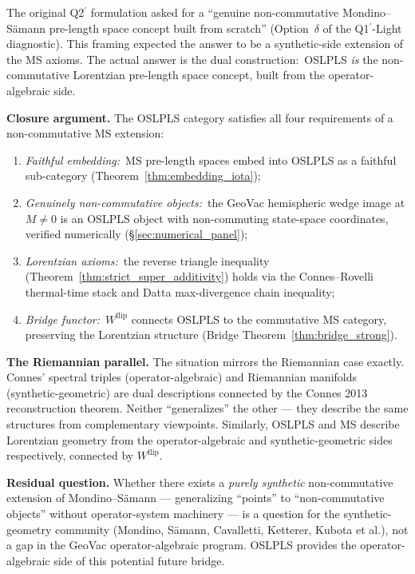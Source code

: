 \documentclass[11pt,a4paper]{article}
\theoremstyle{plain}
\theoremstyle{definition}
\newcommand{\Wflip}{W^{\mathrm{flip}}}
\begin{document}
The original Q2$^{\prime}$ formulation asked for a ``genuine
non-commutative Mondino--S\"amann pre-length space concept built
from scratch'' (Option~$\delta$ of the Q1$^{\prime}$-Light
diagnostic). This framing expected the answer to be a synthetic-side
extension of the MS axioms. The actual answer is the dual
construction:\ OSLPLS \emph{is} the non-commutative Lorentzian
pre-length space concept, built from the operator-algebraic side.

\textbf{Closure argument.}  The OSLPLS category satisfies all four
requirements of a non-commutative MS extension:
\begin{enumerate}
\item \emph{Faithful embedding:}\ MS pre-length spaces embed into
  OSLPLS as a faithful sub-category
  (Theorem~\ref{thm:embedding_iota});
\item \emph{Genuinely non-commutative objects:}\ the GeoVac
  hemispheric wedge image at $M \ne 0$ is an OSLPLS object with
  non-commuting state-space coordinates, verified numerically
  (\S\ref{sec:numerical_panel});
\item \emph{Lorentzian axioms:}\ the reverse triangle inequality
  (Theorem~\ref{thm:strict_super_additivity}) holds via the
  Connes--Rovelli thermal-time stack and Datta max-divergence chain inequality;
\item \emph{Bridge functor:}\ $\Wflip$ connects OSLPLS to the
  commutative MS category, preserving the Lorentzian structure
  (Bridge Theorem~\ref{thm:bridge_strong}).
\end{enumerate}

\textbf{The Riemannian parallel.}  The situation mirrors the
Riemannian case exactly.  Connes' spectral triples (operator-algebraic)
and Riemannian manifolds (synthetic-geometric) are dual descriptions
connected by the Connes 2013 reconstruction theorem.  Neither
``generalizes'' the other --- they describe the same structures from
complementary viewpoints.  Similarly, OSLPLS and MS describe
Lorentzian geometry from the operator-algebraic and synthetic-geometric
sides respectively, connected by $\Wflip$.

\textbf{Residual question.}  Whether there exists a \emph{purely
synthetic} non-commutative extension of Mondino--S\"amann ---
generalizing ``points'' to ``non-commutative objects'' without
operator-system machinery --- is a question for the synthetic-geometry
community (Mondino, S\"amann, Cavalletti, Ketterer, Kubota et al.),
not a gap in the GeoVac operator-algebraic program.  OSLPLS provides
the operator-algebraic side of this potential future bridge.
\end{document}
